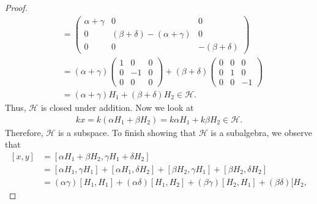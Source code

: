 \documentclass[12pt]{article}
\theoremstyle{definition}
\begin{document}
\begin{enumerate}
\begin{enumerate}[label=(\alph*)]
\begin{proof}
\begin{equation*}
\begin{split}
                                &=\begin{pmatrix}\alpha+\gamma&0&0\\0&(\beta+\delta)-(\alpha+\gamma)&0\\
                                0&0&-(\beta+\delta)\end{pmatrix} \\
                                &=(\alpha+\gamma)\begin{pmatrix}1&0&0\\0&-1&0\\0&0&0\end{pmatrix}+
                                (\beta+\delta)\begin{pmatrix}0&0&0\\0&1&0\\0&0&-1\end{pmatrix}\\
                                &=(\alpha+\gamma)H_1+(\beta+\delta)H_2\in\mathcal{H}.
                            \end{split}
                        \end{equation*}
                        Thus, $\mathcal{H}$ is closed under addition. Now we
                        look at 
                        \begin{equation*}
                            \begin{split}
                                kx = k(\alpha H_1+\beta H_2)=k\alpha
                                H_1+k\beta H_2\in\mathcal{H}.
                            \end{split}
                        \end{equation*}
                        Therefore, $\mathcal{H}$ is a subspace. 
                        To finish showing that $\mathcal{H}$ is a subalgebra, we
                        observe that 
                        \begin{equation*}
                            \begin{split}
                                [x, y] &= [\alpha H_1+\beta H_2, \gamma
                                H_1+\delta H_2] \\
                                &=[\alpha H_1, \gamma H_1]+[\alpha H_1, \delta
                                H_2]+[\beta H_2, \gamma H_1]+[\beta H_2, \delta
                                H_2] \\
                                &=(\alpha\gamma)[H_1, H_1]+(\alpha\delta)[H_1,
                                H_2]+(\beta\gamma)[H_2, H_1]+(\beta\delta)[H_2,

\end{split}
\end{equation*}
\end{proof}
\end{enumerate}
\end{enumerate}
\end{document}
